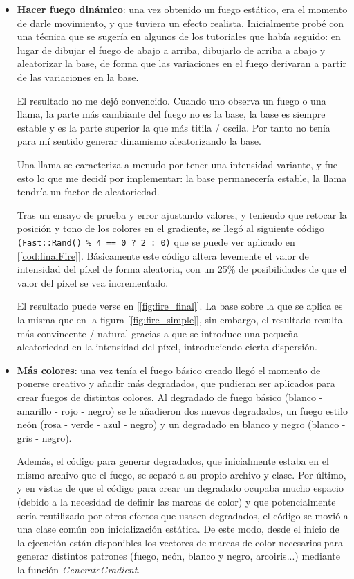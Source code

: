 \begin{itemize}
	\item \textbf{Hacer fuego dinámico}: una vez obtenido un fuego estático, era el momento de darle movimiento, y que tuviera un efecto realista. Inicialmente probé con una técnica que se sugería en algunos de los tutoriales que había seguido: en lugar de dibujar el fuego de abajo a arriba, dibujarlo de arriba a abajo y aleatorizar la base, de forma que las variaciones en el fuego derivaran a partir de las variaciones en la base.
	
	El resultado no me dejó convencido. Cuando uno observa un fuego o una llama, la parte más cambiante del fuego no es la base, la base es siempre estable y es la parte superior la que más titila / oscila. Por tanto no tenía para mí sentido generar dinamismo aleatorizando la base.
	
	Una llama se caracteriza a menudo por tener una intensidad variante, y fue esto lo que me decidí por implementar: la base permanecería estable, la llama tendría un factor de aleatoriedad.
	
	Tras un ensayo de prueba y error ajustando valores, y teniendo que retocar la posición y tono de los colores en el gradiente, se llegó al siguiente código \lstinline{(Fast::Rand() % 4 == 0 ? 2 : 0)} que se puede ver aplicado en [\ref{cod:finalFire}]. Básicamente este código altera levemente el valor de intensidad del píxel de forma aleatoria, con un 25\% de posibilidades de que el valor del píxel se vea incrementado. 
	
	El resultado puede verse en [\ref{fig:fire_final}]. La base sobre la que se aplica es la misma que en la figura [\ref{fig:fire_simple}], sin embargo, el resultado resulta más convincente / natural gracias a que se introduce una pequeña aleatoriedad en la intensidad del píxel, introduciendo cierta dispersión.
	
	\item \textbf{Más colores}: una vez tenía el fuego básico creado llegó el momento de ponerse creativo y añadir más degradados, que pudieran ser aplicados para crear fuegos de distintos colores. Al degradado de fuego básico (blanco - amarillo - rojo - negro) se le añadieron dos nuevos degradados, un fuego estilo neón (rosa - verde - azul - negro) y un degradado en blanco y negro (blanco - gris - negro).
	
	Además, el código para generar degradados, que inicialmente estaba en el mismo archivo que el fuego, se separó a su propio archivo y clase. Por último, y en vistas de que el código para crear un degradado ocupaba mucho espacio (debido a la necesidad de definir las marcas de color) y que potencialmente sería reutilizado por otros efectos que usasen degradados, el código se movió a una clase común con inicialización estática. De este modo, desde el inicio de la ejecución están disponibles los vectores de marcas de color necesarios para generar distintos patrones (fuego, neón, blanco y negro, arcoiris...) mediante la función \emph{GenerateGradient}.
	

\end{itemize}
